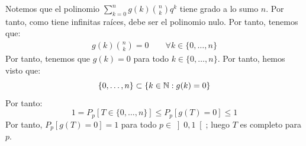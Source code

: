 \begin{ejemplo}
    Notemos que el polinomio $\sum\limits_{k=0}^n g(k) \binom{n}{k} q^k$ tiene grado a lo sumo $n$. Por tanto, como tiene infinitas raíces, debe ser el polinomio nulo. Por tanto, tenemos que:
    \begin{align*}
        g(k) \binom{n}{k} = 0 \qquad \forall k\in\{0, \ldots, n\}
    \end{align*}
    Por tanto, tenemos que $g(k) = 0$ para todo $k\in\{0, \ldots, n\}$. Por tanto, hemos visto que:
    \begin{equation*}
        \{0, \ldots, n\} \subset \{k\in\mathbb{N} : g(k) = 0\}
    \end{equation*}
    Por tanto:
    \begin{equation*}
        1=P_p[T\in \{0, \ldots, n\}] \leq P_p[g(T)=0]\leq 1
    \end{equation*}
    Por tanto, $P_p[g(T)=0] = 1$ para todo $p\in\left]0, 1\right[$; luego $T$ es completo para $p$.
\end{ejemplo}

